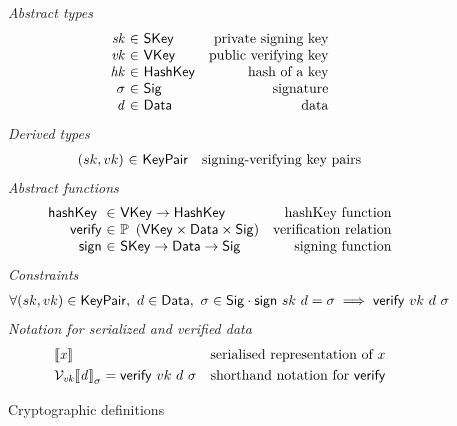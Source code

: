 \begin{figure}[htb]
  \emph{Abstract types}
  \begin{equation*}
    \begin{array}{r@{~\in~}lr}
      \var{sk} & \SKey & \text{private signing key}\\
      \var{vk} & \VKey & \text{public verifying key}\\
      \var{hk} & \HashKey & \text{hash of a key}\\
      \sigma & \Sig  & \text{signature}\\
      \var{d} & \Data  & \text{data}\\
    \end{array}
  \end{equation*}
  \emph{Derived types}
  \begin{equation*}
    \begin{array}{r@{~\in~}lr}
      (sk, vk) & \KeyPair & \text{signing-verifying key pairs}
    \end{array}
  \end{equation*}
  \emph{Abstract functions}
  \begin{equation*}
    \begin{array}{r@{~\in~}lr}
      \hashKey{} & \VKey \to \HashKey
                 & \text{hashKey function} \\
      \fun{verify} & \powerset{\left(\VKey \times \Data \times \Sig\right)}
                   & \text{verification relation}\\
      \fun{sign} & \SKey \to \Data \to \Sig
                 & \text{signing function}\\
    \end{array}
  \end{equation*}
  \emph{Constraints}
  \begin{align*}
    & \forall (sk, vk) \in \mathsf{KeyPair},~ d \in \mathsf{Data},~ \sigma \in \mathsf{Sig} \cdot
    \mathsf{sign} ~ sk ~ d = \sigma \implies \mathsf{verify} ~ vk ~ d ~ \sigma
  \end{align*}
  \emph{Notation for serialized and verified data}
  \begin{align*}
    & \llbracket \mathit{x} \rrbracket & \text{serialised representation of } x\\
    & \mathcal{V}_{\mathit{vk}}{\llbracket \mathit{d} \rrbracket}_{\sigma} = \mathsf{verify} ~ vk ~ d ~ \sigma
    & \text{shorthand notation for } \mathsf{verify}
  \end{align*}
  \caption{Cryptographic definitions}
  \label{fig:crypto-defs-shelley}
\end{figure}

